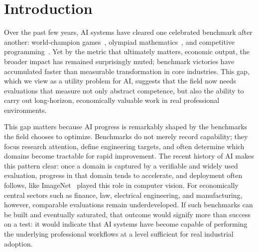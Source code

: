 \documentclass{llmxive}
\begin{document}
\vspace{-1em}
\section{Introduction}
\vspace{-.5em}
Over the past few years, AI systems have cleared one celebrated benchmark after another: world-champion
games~\citep{silver2016alphago}, olympiad mathematics~\citep{deepmind2025geminiimo}, and
competitive programming~\citep{google2025geminiicpc}. Yet by the metric that ultimately matters, economic output, the broader impact has remained surprisingly muted; benchmark victories have accumulated faster than measurable transformation in core industries. This gap, which we view as a utility problem for AI, suggests that the field now needs evaluations that measure not only abstract competence, but also the ability to carry out long-horizon, economically valuable work in real professional environments. 

This gap matters because AI progress is remarkably shaped by the benchmarks the field chooses to optimize. Benchmarks do not merely record capability; they focus research attention, define engineering targets, and often determine which domains become tractable for rapid improvement. The recent history of AI makes this pattern clear: once a domain is captured by a verifiable and widely used evaluation, progress in that domain tends to accelerate, and deployment often follows, like ImageNet~\citep{deng2009imagenet} played this role in computer vision. For economically central sectors such as finance, law, electrical engineering, and manufacturing, however, comparable evaluations remain underdeveloped. If such benchmarks can be built and eventually saturated, that outcome would signify more than success on a test: it would indicate that AI systems have become capable of performing the underlying professional workflows at a level sufficient for real industrial adoption.
\end{document}
